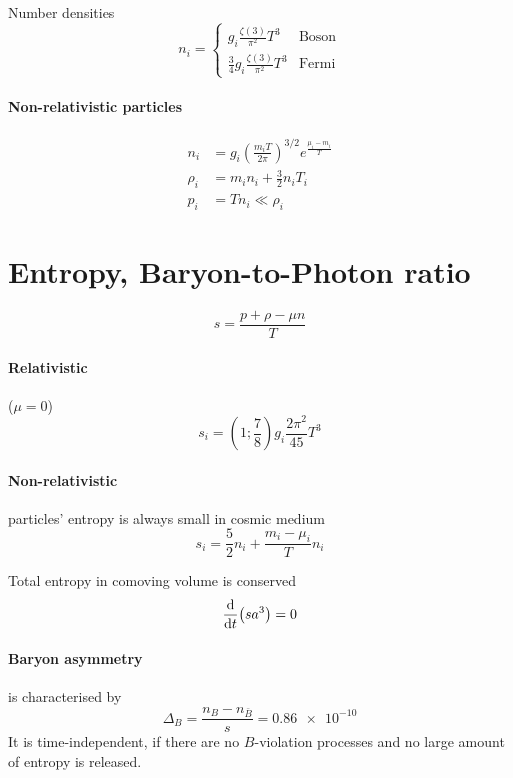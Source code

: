 \documentclass[12pt, a4paper, DIV=15]{article}
\numberwithin{equation}{section}
\begin{document}
Number densities
\begin{equation}
   n_i =
   \begin{cases}
      g_i \frac{\zeta(3)}{\pi^2} T^3 & \text{Boson} \\
      \frac{3}{4} g_i \frac{\zeta(3)}{\pi^2} T^3 & \text{Fermi}
   \end{cases}
\end{equation}

\paragraph{Non-relativistic particles}
\begin{align}
   n_i &= g_i \left( \frac{m_i T}{2\pi} \right)^{3/2} e^{\frac{\mu_i - m_i}{T}} \\
   \rho_i &= m_i n_i + \frac{3}{2} n_i T_i \\
   p_i &= T n_i \ll \rho_i
\end{align}

\section{Entropy, Baryon-to-Photon ratio}
\begin{equation}
   s = \frac{p + \rho -\mu n }{ T} 
\end{equation}

\paragraph{Relativistic} ($\mu = 0$)
\begin{equation}
   s_i = (1; \frac{7}{8}) g_i \frac{2\pi^2}{45} T^3
\end{equation}

\paragraph{Non-relativistic} particles' entropy is always small in cosmic medium
\begin{equation}
   s_i = \frac{5}{2} n_i + \frac{m_i - \mu_i}{T}n_i
\end{equation}

Total entropy in comoving volume is conserved
\begin{equation}
   \dv{t} (sa^3) = 0
\end{equation}

\paragraph{Baryon asymmetry} is characterised by
\begin{equation}
   \Delta_B =  \frac{n_B - n_{\bar{B}}}{s} = \num{0.86e-10}
\end{equation}
It is time-independent, if there are no $B$-violation processes and no large amount of entropy is released.
\end{document}
